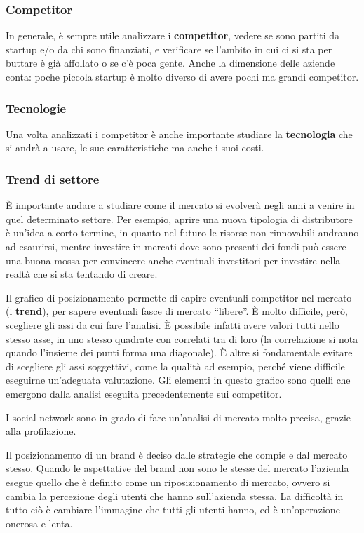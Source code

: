 \subsubsection{Competitor}
In generale, è sempre utile analizzare i \textbf{competitor}, vedere se sono
partiti da startup e/o da chi sono finanziati, e verificare se l'ambito in cui
ci si sta per buttare è già affollato o se c'è poca gente. Anche la dimensione
delle aziende conta: poche piccola startup è molto diverso di avere pochi ma
grandi competitor.

\subsubsection{Tecnologie}
Una volta analizzati i competitor è anche importante studiare la
\textbf{tecnologia} che si andrà a usare, le sue caratteristiche ma anche i
suoi costi.

\subsubsection{Trend di settore}
È importante andare a studiare come il mercato si evolverà negli anni a venire
in quel determinato settore.
Per esempio, aprire una nuova tipologia di distributore è un'idea a corto
termine, in quanto nel futuro le risorse non rinnovabili andranno ad esaurirsi,
mentre investire in mercati dove sono presenti dei fondi può essere una buona
mossa per convincere anche eventuali investitori per investire nella realtà che
si sta tentando di creare.

Il grafico di posizionamento permette di capire eventuali competitor nel
mercato (i \textbf{trend}), per sapere eventuali fasce di mercato ``libere''.
È molto difficile, però, scegliere gli assi da cui fare l'analisi. È possibile
infatti avere valori tutti nello stesso asse, in uno stesso quadrate con
correlati tra di loro (la correlazione si nota quando l'insieme dei punti forma
una diagonale). È altre sì fondamentale evitare di scegliere gli assi
soggettivi, come la qualità ad esempio, perché viene difficile eseguirne
un'adeguata valutazione. Gli elementi in questo grafico sono quelli che
emergono dalla analisi eseguita precedentemente sui competitor.


I social network sono in grado di fare un'analisi di mercato molto precisa,
grazie alla profilazione.

Il posizionamento di un brand è deciso dalle strategie che compie e dal mercato
stesso. Quando le aspettative del brand non sono le stesse del mercato
l'azienda esegue quello che è definito come un riposizionamento di mercato,
ovvero si cambia la percezione degli utenti che hanno sull'azienda stessa. La
difficoltà in tutto ciò è cambiare l'immagine che tutti gli utenti hanno, ed è
un'operazione onerosa e lenta.

